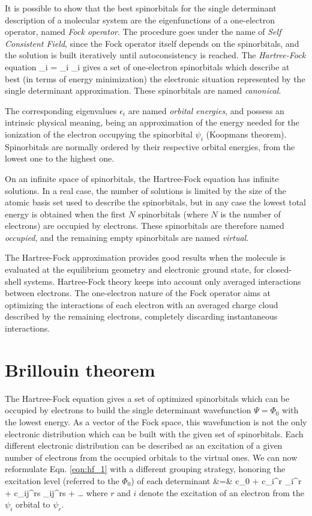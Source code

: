It is possible to show that the best spinorbitals for the single determinant
description of a molecular system are the eigenfunctions of a one-electron
operator, named \textit{Fock operator}. The procedure goes under the name of
\textit{Self Consistent Field}, since the Fock operator itself depends on the
spinorbitals, and the solution is built iteratively until autoconsistency is
reached. The \textit{Hartree-Fock} equation
\beq
\label{eqn:hf_2}
\fock \psi_i = \epsilon_i \psi_i
\eeq
gives a set of one-electron spinorbitals which describe at best (in terms of
energy minimization) the electronic situation represented by the single
determinant approximation. These spinorbitals are named \textit{canonical}.

The corresponding eigenvalues $\epsilon_i$ are named \textit{orbital
energies}, and possess an intrinsic physical meaning, being an approximation
of the energy needed for the ionization of the electron occupying the
spinorbital $\psi_i$ (Koopmans theorem\cite{tp-1-104-1933}). Spinorbitals
are normally ordered by their respective orbital energies, from the lowest
one to the highest one. 

On an infinite space of spinorbitals, the Hartree-Fock equation has infinite
solutions. In a real case, the number of solutions is limited by the size of
the atomic basis set used to describe the spinorbitals, but in any case the
lowest total energy is obtained when the first $N$ spinorbitals (where $N$
is the number of electrons) are occupied by electrons. These spinorbitals
are therefore named \textit{occupied}, and the remaining empty spinorbitals
are named \textit{virtual}.

The Hartree-Fock approximation provides good results when the molecule is
evaluated at the equilibrium geometry and electronic ground state, for
closed-shell systems.  Hartree-Fock theory keeps into account only averaged
interactions between electrons. The one-electron nature of the Fock operator
aims at optimizing the interactions of each electron with an averaged charge
cloud described by the remaining electrons, completely discarding
instantaneous interactions.

\section{Brillouin theorem}

The Hartree-Fock equation gives a set of optimized spinorbitals which can be
occupied by electrons to build the single determinant wavefunction $\Psi =
\Phi_0$ with the lowest energy. As a vector of the Fock space, this
wavefunction is not the only electronic distribution which can be built with
the given set of
spinorbitals. Each different electronic distribution can be described as an
excitation of a given number of electrons from the occupied orbitals to the
virtual ones.  We can now reformulate Eqn. \ref{eqn:hf_1} with a different
grouping strategy, honoring the excitation level (referred to the $\Phi_0$)
of each determinant
\beqa
\label{eqn:mr}
\Psi &=& c_0  +  c_i^r \Phi_i^r + 
c_{ij}^{rs} \Phi_{ij}^{rs} + \ldots
\eeqa
where $r$ and $i$ denote the excitation of an electron from the
$\psi_i$ orbital to $\psi_r$.

